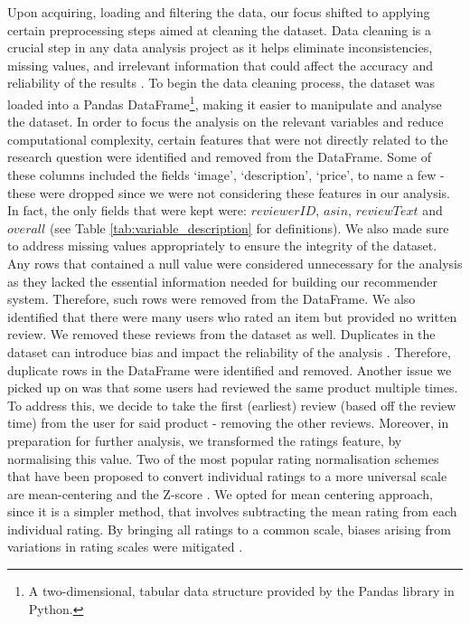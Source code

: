 Upon acquiring, loading and filtering the data, our focus shifted to applying certain preprocessing steps aimed at cleaning the dataset. Data cleaning is a crucial step in any data analysis project as it helps eliminate inconsistencies, missing values, and irrelevant information that could affect the accuracy and reliability of the results \cite{witten2005practical}. To begin the data cleaning process, the dataset was loaded into a Pandas DataFrame\footnote{A two-dimensional, tabular data structure provided by the Pandas library in Python.}, making it easier to manipulate and analyse the dataset. In order to focus the analysis on the relevant variables and reduce computational complexity, certain features that were not directly related to the research question were identified and removed from the DataFrame. Some of these columns included the fields ‘image’, ‘description’, ‘price’, to name a few - these were dropped since we were not considering these features in our analysis. In fact, the only fields that were kept were: $reviewerID$, $asin$, $reviewText$ and $overall$ (see Table \ref{tab:variable_description} for definitions). We also made sure to address missing values appropriately to ensure the integrity of the dataset. Any rows that contained a null value were considered unnecessary for the analysis as they lacked the essential information needed for building our recommender system. Therefore, such rows were removed from the DataFrame. We also identified that there were many users who rated an item but provided no written review. We removed these reviews from the dataset as well. Duplicates in the dataset can introduce bias and impact the reliability of the analysis \cite{witten2005practical}. Therefore, duplicate rows in the DataFrame were identified and removed. Another issue we picked up on was that some users had reviewed the same product multiple times. To address this, we decide to take the first (earliest) review (based off the review time) from the user for said product - removing the other reviews. Moreover, in preparation for further analysis, we transformed the ratings feature, by normalising this value. Two of the most popular rating normalisation schemes that have been proposed to convert individual ratings to a more universal scale are mean-centering and the Z-score \cite{desrosiers2010comprehensive}. We opted for mean centering approach, since it is a simpler method, that involves subtracting the mean rating from each individual rating. By bringing all ratings to a common scale, biases arising from variations in rating scales were mitigated \cite{he2016fast}.

